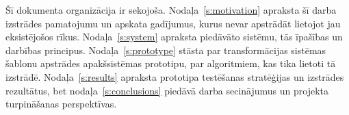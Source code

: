 
Šī dokumenta organizācija ir sekojoša. Nodaļa~\ref{s:motivation} apraksta šī darba izstrādes pamatojumu un apskata gadījumus, kurus nevar apstrādāt lietojot jau eksistējošos rīkus. Nodaļa~\ref{s:system} apraksta piedāvāto sistēmu, tās īpašības un darbības principus. Nodaļa~\ref{s:prototype} stāsta par transformācijas sistēmas šablonu apstrādes apakšsistēmas prototipu, par algoritmiem, kas tika lietoti tā izstrādē. Nodaļa~\ref{s:results} apraksta prototipa testēšanas stratēģijas un izstrādes rezultātus, bet nodaļa~\ref{s:conclusions} piedāvā darba secinājumus un projekta turpināšanas perspektīvas.
